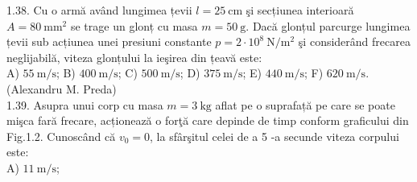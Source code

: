 \documentclass[10pt]{article}
\begin{document}
1.38. Cu o armă având lungimea țevii $l=25 \mathrm{~cm}$ şi secțiunea interioară $A=80 \mathrm{~mm}^{2}$ se trage un glonț cu masa $m=50 \mathrm{~g}$. Dacă glonțul parcurge lungimea țevii sub acțiunea unei presiuni constante $p=2 \cdot 10^{8} \mathrm{~N} / \mathrm{m}^{2}$ şi considerând frecarea neglijabilă, viteza glonțului la ieşirea din țeavă este:\\ A) $55 \mathrm{~m} / \mathrm{s}$; B) $400 \mathrm{~m} / \mathrm{s}$; C) $500 \mathrm{~m} / \mathrm{s}$; D) $375 \mathrm{~m} / \mathrm{s}$; E) $440 \mathrm{~m} / \mathrm{s}$; F) $620 \mathrm{~m} / \mathrm{s}$.\\ (Alexandru M. Preda)\\

1.39. Asupra unui corp cu masa $m=3 \mathrm{~kg}$ aflat pe o suprafață pe care se poate mişca fară frecare, acționează o forţă care depinde de timp conform graficului din Fig.1.2. Cunoscând că $v_{0}=0$, la sfârşitul celei de a 5 -a secunde viteza corpului este:\\ A) $11 \mathrm{~m} / \mathrm{s}$; 
\end{document}

